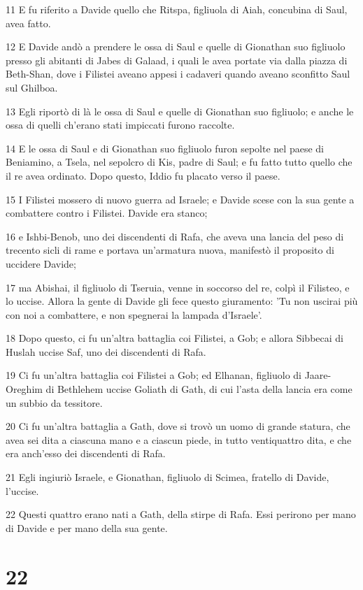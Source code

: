 \par 11 E fu riferito a Davide quello che Ritspa, figliuola di Aiah, concubina di Saul, avea fatto.
\par 12 E Davide andò a prendere le ossa di Saul e quelle di Gionathan suo figliuolo presso gli abitanti di Jabes di Galaad, i quali le avea portate via dalla piazza di Beth-Shan, dove i Filistei aveano appesi i cadaveri quando aveano sconfitto Saul sul Ghilboa.
\par 13 Egli riportò di là le ossa di Saul e quelle di Gionathan suo figliuolo; e anche le ossa di quelli ch'erano stati impiccati furono raccolte.
\par 14 E le ossa di Saul e di Gionathan suo figliuolo furon sepolte nel paese di Beniamino, a Tsela, nel sepolcro di Kis, padre di Saul; e fu fatto tutto quello che il re avea ordinato. Dopo questo, Iddio fu placato verso il paese.
\par 15 I Filistei mossero di nuovo guerra ad Israele; e Davide scese con la sua gente a combattere contro i Filistei. Davide era stanco;
\par 16 e Ishbi-Benob, uno dei discendenti di Rafa, che aveva una lancia del peso di trecento sicli di rame e portava un'armatura nuova, manifestò il proposito di uccidere Davide;
\par 17 ma Abishai, il figliuolo di Tseruia, venne in soccorso del re, colpì il Filisteo, e lo uccise. Allora la gente di Davide gli fece questo giuramento: 'Tu non uscirai più con noi a combattere, e non spegnerai la lampada d'Israele'.
\par 18 Dopo questo, ci fu un'altra battaglia coi Filistei, a Gob; e allora Sibbecai di Huslah uccise Saf, uno dei discendenti di Rafa.
\par 19 Ci fu un'altra battaglia coi Filistei a Gob; ed Elhanan, figliuolo di Jaare-Oreghim di Bethlehem uccise Goliath di Gath, di cui l'asta della lancia era come un subbio da tessitore.
\par 20 Ci fu un'altra battaglia a Gath, dove si trovò un uomo di grande statura, che avea sei dita a ciascuna mano e a ciascun piede, in tutto ventiquattro dita, e che era anch'esso dei discendenti di Rafa.
\par 21 Egli ingiuriò Israele, e Gionathan, figliuolo di Scimea, fratello di Davide, l'uccise.
\par 22 Questi quattro erano nati a Gath, della stirpe di Rafa. Essi perirono per mano di Davide e per mano della sua gente.

\chapter{22}

